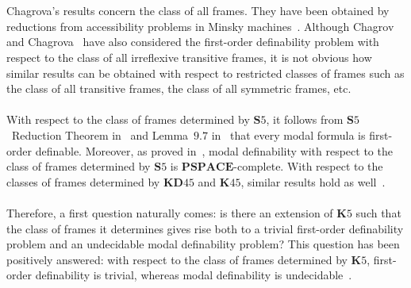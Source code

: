 \documentclass[draft]{article}
\def\PSPACE{\mathbf{PSPACE}}
\def\S{\mathbf{S}}
\def\K{\mathbf{K}}
\def\KD{\mathbf{KD}}
\begin{document}
%
%
%
%
%
%
\\
\\
%
%
Chagrova's results concern the class of all frames.
They have been obtained by reductions from accessibility problems in Minsky machines~\cite{Chagrov:Chagrova:2006}.
Although Chagrov and Chagrova~\cite{Chagrov:Chagrova:1995} have also considered the first-order definability problem with respect to the class of all irreflexive transitive frames, it is not obvious how similar results can be obtained with respect to restricted classes of frames such as the class of all transitive frames, the class of all symmetric frames, etc.
%
%
\\
\\
%
%
With respect to the class of frames determined by $\S5$, it follows from $\S5$~Reduction Theorem in~\cite[Page~$51$]{Hughes:Cresswell:1968} and Lemma~$9.7$ in~\cite[Page~$99$]{vanBenthem:1983} that every modal formula is first-order definable.
Moreover, as proved in~\cite{Balbiani:Tinchev:2005,Balbiani:Tinchev:2006}, modal definability with respect to the class of frames determined by $\S5$ is $\PSPACE$-complete.
%
%
%
%
With respect to the classes of frames determined by $\KD45$ and $\K45$, similar results hold as well~\cite{Georgiev:2017a,Georgiev:2017b}.
%
%
\\
\\
%
%
Therefore, a first question naturally comes: is there an extension of $\K5$ such that the class of frames it determines gives rise both to a trivial first-order definability problem and an undecidable modal definability problem?
This question has been positively answered: with respect to the class of frames determined by $\K5$, first-order definability is trivial, whereas modal definability is undecidable~\cite{Balbiani:Georgiev:Tinchev:2018}.
\end{document}
